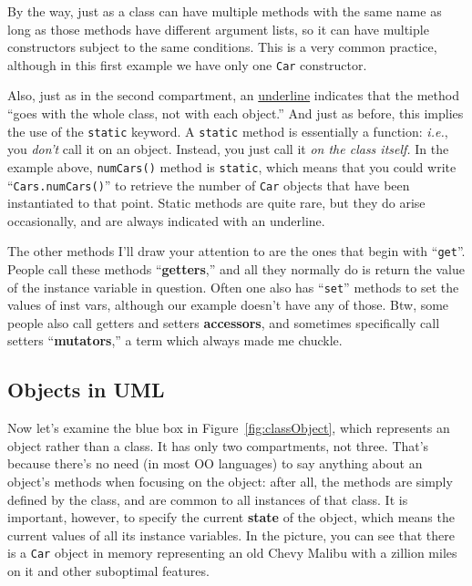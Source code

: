 By the way, just as a class can have multiple methods with the same name as
long as those methods have different argument lists, so it can have multiple
constructors subject to the same conditions. This is a very common practice,
although in this first example we have only one \texttt{Car} constructor.

Also, just as in the second compartment, an \underline{underline} indicates
that the method ``goes with the whole class, not with each object.'' And just
as before, this implies the use of the \texttt{static} keyword. A
\texttt{static} method is essentially a function: \textit{i.e.}, you
\textit{don't} call it on an object. Instead, you just call it \textit{on the
class itself.} In the example above, \texttt{numCars()} method is
\texttt{static}, which means that you could write ``\texttt{Cars.numCars()}''
to retrieve the number of \texttt{Car} objects that have been instantiated to
that point. Static methods are quite rare, but they do arise occasionally, and
are always indicated with an underline.

The other methods I'll draw your attention to are the ones that begin with
``\texttt{get}''. People call these methods ``\textbf{getters},'' and all they
normally do is return the value of the instance variable in question. Often
one also has ``\texttt{set}'' methods to set the values of inst vars, although
our example doesn't have any of those. Btw, some people also call getters and
setters \textbf{accessors}, and sometimes specifically call setters
``\textbf{mutators},'' a term which always made me chuckle.

\subsection{Objects in UML}

Now let's examine the blue box in Figure~\ref{fig:classObject}, which
represents an object rather than a class. It has only two compartments, not
three. That's because there's no need (in most OO languages) to say anything
about an object's methods when focusing on the object: after all, the methods
are simply defined by the class, and are common to all instances of that
class. It is important, however, to specify the current \textbf{state} of the
object, which means the current values of all its instance variables. In the
picture, you can see that there is a \texttt{Car} object in memory
representing an old Chevy Malibu with a zillion miles on it and other
suboptimal features.


